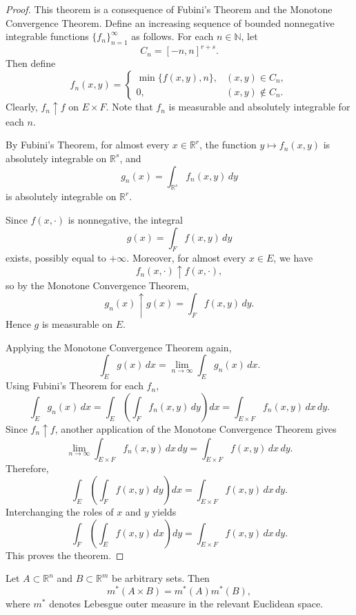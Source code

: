 \begin{proof}
This theorem is a consequence of Fubini's Theorem and the Monotone Convergence
Theorem. Define an increasing sequence of bounded nonnegative integrable functions
$\{f_n\}_{n=1}^\infty$ as follows. For each $n \in \mathbb{N}$, let
\[
    C_n = [-n,n]^{r+s}.
\]
Then define
\[
    f_n(x,y)=
    \begin{cases}
        \min\{f(x,y),n\}, & (x,y)\in C_n,\\
        0, & (x,y)\notin C_n.
    \end{cases}
\]
Clearly, $f_n \uparrow f$ on $E\times F$. Note that \(f_n\) is measurable and absolutely integrable for each \(n\).  

By Fubini's Theorem, for almost every $x \in \mathbb{R}^r$, the function
$y \mapsto f_n(x,y)$ is absolutely integrable on $\mathbb{R}^s$, and
\[
    g_n(x) = \int_{\mathbb{R}^s} f_n(x,y)\,dy
\]
is absolutely integrable on $\mathbb{R}^r$.

Since $f(x,\cdot)$ is nonnegative, the integral
\[
    g(x) = \int_F f(x,y)\,dy
\]
exists, possibly equal to $+\infty$. Moreover, for almost every $x \in E$,
we have
\[
    f_n(x,\cdot)\uparrow f(x,\cdot),
\]
so by the Monotone Convergence Theorem,
\[
    g_n(x)\uparrow g(x)=\int_F f(x,y)\,dy.
\]
Hence $g$ is measurable on $E$.

Applying the Monotone Convergence Theorem again,
\[
    \int_E g(x)\,dx
    =
    \lim_{n\to\infty}\int_E g_n(x)\,dx.
\]
Using Fubini's Theorem for each $f_n$,
\[
    \int_E g_n(x)\,dx
    =
    \int_E \left(\int_F f_n(x,y)\,dy\right) dx
    =
    \int_{E\times F} f_n(x,y)\,dx\,dy.
\]
Since $f_n \uparrow f$, another application of the Monotone Convergence Theorem gives
\[
    \lim_{n\to\infty}\int_{E\times F} f_n(x,y)\,dx\,dy
    =
    \int_{E\times F} f(x,y)\,dx\,dy.
\]
Therefore,
\[
    \int_E \left(\int_F f(x,y)\,dy\right) dx
    =
    \int_{E\times F} f(x,y)\,dx\,dy.
\]
Interchanging the roles of $x$ and $y$ yields
\[
    \int_F \left(\int_E f(x,y)\,dx\right) dy
    =
    \int_{E\times F} f(x,y)\,dx\,dy.
\]
This proves the theorem.
\end{proof}

\begin{proposition}
Let $A\subset \mathbb{R}^{n}$ and $B\subset \mathbb{R}^{m}$ be arbitrary sets. Then
$$m^{*}(A\times B)=m^{*}(A)m^{*}(B),$$
where $m^{*}$ denotes Lebesgue outer measure in the relevant Euclidean space.
\end{proposition}

